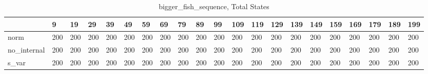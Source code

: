 \begin{table}
\centering
\caption{bigger_fish_sequence, Total States}
\label{bigger_fish_sequence_total}
\begin{tabular}{lllllllllllllllllllll}
\toprule
{} &    9 &   19 &   29 &   39 &   49 &   59 &   69 &   79 &   89 &   99 &  109 &  119 &  129 &  139 &  149 &  159 &  169 &  179 &  189 &  199 \\
\midrule
norm        &  200 &  200 &  200 &  200 &  200 &  200 &  200 &  200 &  200 &  200 &  200 &  200 &  200 &  200 &  200 &  200 &  200 &  200 &  200 &  200 \\
no\_internal &  200 &  200 &  200 &  200 &  200 &  200 &  200 &  200 &  200 &  200 &  200 &  200 &  200 &  200 &  200 &  200 &  200 &  200 &  200 &  200 \\
s\_var       &  200 &  200 &  200 &  200 &  200 &  200 &  200 &  200 &  200 &  200 &  200 &  200 &  200 &  200 &  200 &  200 &  200 &  200 &  200 &  200 \\
\bottomrule
\end{tabular}
\end{table}
